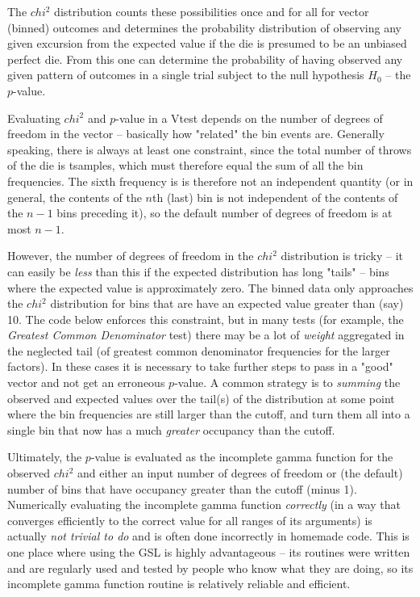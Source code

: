 \documentclass{book}
\begin{document}
The $chi^2$ distribution counts these possibilities once and for all for
vector (binned) outcomes and determines the probability distribution of
observing any given excursion from the expected value if the die is
presumed to be an unbiased perfect die.  From this one can determine the
probability of having observed any given pattern of outcomes in a single
trial subject to the null hypothesis $H_0$ -- the $p$-value.

Evaluating $chi^2$ and $p$-value in a Vtest depends on the number of
degrees of freedom in the vector -- basically how "related" the bin
events are.  Generally speaking, there is always at least one
constraint, since the total number of throws of the die is tsamples,
which must therefore equal the sum of all the bin frequencies.  The
sixth frequency is is therefore not an independent quantity (or in
general, the contents of the $n$th (last) bin is not independent of the
contents of the $n-1$ bins preceding it), so the default number of
degrees of freedom is at most $n-1$.

However, the number of degrees of freedom in the $chi^2$ distribution is
tricky -- it can easily be {\em less} than this if the expected
distribution has long "tails" -- bins where the expected value is
approximately zero.  The binned data only approaches the $chi^2$
distribution for bins that are have an expected value greater than (say)
10.  The code below enforces this constraint, but in many tests (for
example, the {\em Greatest Common Denominator} test) there may be a lot
of {\em weight} aggregated in the neglected tail (of greatest common
denominator frequencies for the larger factors).  In these cases it is
necessary to take further steps to pass in a "good" vector and not get
an erroneous $p$-value.  A common strategy is to {\em summing} the
observed and expected values over the tail(s) of the distribution at
some point where the bin frequencies are still larger than the cutoff,
and turn them all into a single bin that now has a much {\em greater}
occupancy than the cutoff.

Ultimately, the $p$-value is evaluated as the incomplete gamma function
for the observed $chi^2$ and either an input number of degrees of
freedom or (the default) number of bins that have occupancy greater than
the cutoff (minus 1).  Numerically evaluating the incomplete gamma
function {\em correctly} (in a way that converges efficiently to the
correct value for all ranges of its arguments) is actually {\em not
trivial to do} and is often done incorrectly in homemade code.  This is
one place where using the GSL is highly advantageous -- its routines
were written and are regularly used and tested by people who know what
they are doing, so its incomplete gamma function routine is relatively
reliable and efficient.
\end{document}
